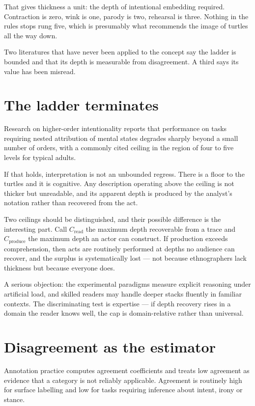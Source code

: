 \documentclass[11pt,a4paper]{article}
\begin{document}
That gives thickness a unit: the depth of intentional embedding required. Contraction is zero, wink is one, parody is two, rehearsal is three. Nothing in the rules stops rung five, which is presumably what recommends the image of turtles all the way down.

Two literatures that have never been applied to the concept say the ladder is bounded and that its depth is measurable from disagreement. A third says its value has been misread.

\section{The ladder terminates}
Research on higher-order intentionality reports that performance on tasks requiring nested attribution of mental states degrades sharply beyond a small number of orders, with a commonly cited ceiling in the region of four to five levels for typical adults.

If that holds, interpretation is not an unbounded regress. There is a floor to the turtles and it is cognitive. Any description operating above the ceiling is not thicker but unreadable, and its apparent depth is produced by the analyst's notation rather than recovered from the act.

Two ceilings should be distinguished, and their possible difference is the interesting part. Call $C_{\text{read}}$ the maximum depth recoverable from a trace and $C_{\text{produce}}$ the maximum depth an actor can construct. If production exceeds comprehension, then acts are routinely performed at depths no audience can recover, and the surplus is systematically lost --- not because ethnographers lack thickness but because everyone does.

A serious objection: the experimental paradigms measure explicit reasoning under artificial load, and skilled readers may handle deeper stacks fluently in familiar contexts. The discriminating test is expertise --- if depth recovery rises in a domain the reader knows well, the cap is domain-relative rather than universal.

\section{Disagreement as the estimator}
Annotation practice computes agreement coefficients and treats low agreement as evidence that a category is not reliably applicable. Agreement is routinely high for surface labelling and low for tasks requiring inference about intent, irony or stance.
\end{document}
